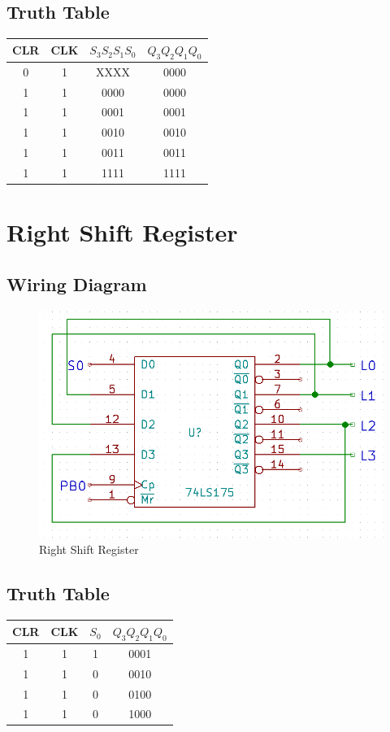 \documentclass[11pt,a4paper]{article}
\begin{document}
\subsection{Truth Table}
\begin{tabular}{| c | c | c | c |}
    \hline CLR & CLK & $S_3S_2S_1S_0$ & $Q_3Q_2Q_1Q_0$ \\
    \hline 0 & 1 & XXXX & 0000 \\
    \hline 1 & 1 & 0000 & 0000 \\
    \hline 1 & 1 & 0001 & 0001 \\
    \hline 1 & 1 & 0010 & 0010 \\
    \hline 1 & 1 & 0011 & 0011 \\
    \hline 1 & 1 & 1111 & 1111 \\
    \hline
\end{tabular}
\section{Right Shift Register}
\subsection{Wiring Diagram}
\begin{figure}[H]
    \centering
    \includegraphics[width=5in]{right_shift.png}
    \caption{Right Shift Register}
\end{figure}
\subsection{Truth Table}
\begin{tabular}{| c | c | c | c |}
    \hline CLR & CLK & $S_0$ & $Q_3Q_2Q_1Q_0$ \\
    \hline 1 & 1 & 1 & 0001 \\
    \hline 1 & 1 & 0 & 0010 \\
    \hline 1 & 1 & 0 & 0100 \\
    \hline 1 & 1 & 0 & 1000 \\
    \hline
\end{tabular}
\end{document}
